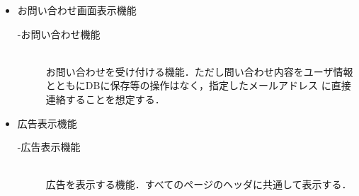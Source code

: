 \begin{itemize}
\begin{description}
    \end{description}
    \item お問い合わせ画面表示機能
    \begin{description}
        \item[-お問い合わせ機能]\mbox{}\\
            お問い合わせを受け付ける機能．ただし問い合わせ内容をユーザ情報とともにDBに保存等の操作はなく，指定したメールアドレス
            に直接連絡することを想定する． 
    \end{description}
    \item 広告表示機能
    \begin{description}
        \item[-広告表示機能]\mbox{}\\
            広告を表示する機能．すべてのページのヘッダに共通して表示する． 
    \end{description}
\end{itemize}  

\clearpage

